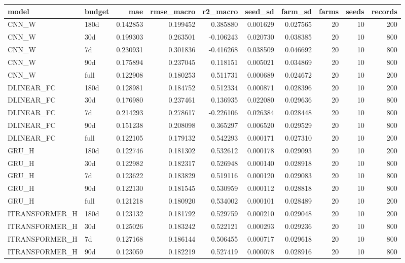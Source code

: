 \begin{tabular}{llrrrrrrrr}
\toprule
model & budget & mae & rmse\_macro & r2\_macro & seed\_sd & farm\_sd & farms & seeds & records \\
\midrule
CNN\_W & 180d & 0.142853 & 0.199452 & 0.385880 & 0.001629 & 0.027565 & 20 & 10 & 200 \\
CNN\_W & 30d & 0.199303 & 0.263501 & -0.106243 & 0.020730 & 0.038385 & 20 & 10 & 800 \\
CNN\_W & 7d & 0.230931 & 0.301836 & -0.416268 & 0.038509 & 0.046692 & 20 & 10 & 800 \\
CNN\_W & 90d & 0.175894 & 0.237045 & 0.118151 & 0.005021 & 0.034869 & 20 & 10 & 800 \\
CNN\_W & full & 0.122908 & 0.180253 & 0.511731 & 0.000689 & 0.024672 & 20 & 10 & 200 \\
DLINEAR\_FC & 180d & 0.128981 & 0.184752 & 0.512334 & 0.000871 & 0.028396 & 20 & 10 & 200 \\
DLINEAR\_FC & 30d & 0.176980 & 0.237461 & 0.136935 & 0.022080 & 0.029636 & 20 & 10 & 800 \\
DLINEAR\_FC & 7d & 0.214293 & 0.278617 & -0.226106 & 0.026384 & 0.028448 & 20 & 10 & 800 \\
DLINEAR\_FC & 90d & 0.151238 & 0.208098 & 0.365297 & 0.006520 & 0.029529 & 20 & 10 & 800 \\
DLINEAR\_FC & full & 0.122105 & 0.179132 & 0.542293 & 0.000171 & 0.027310 & 20 & 10 & 200 \\
GRU\_H & 180d & 0.122746 & 0.181302 & 0.532612 & 0.000178 & 0.029093 & 20 & 10 & 200 \\
GRU\_H & 30d & 0.122982 & 0.182317 & 0.526948 & 0.000140 & 0.028918 & 20 & 10 & 800 \\
GRU\_H & 7d & 0.123622 & 0.183829 & 0.519116 & 0.000120 & 0.029083 & 20 & 10 & 800 \\
GRU\_H & 90d & 0.122130 & 0.181545 & 0.530959 & 0.000112 & 0.028818 & 20 & 10 & 800 \\
GRU\_H & full & 0.121218 & 0.180920 & 0.534002 & 0.000101 & 0.028489 & 20 & 10 & 200 \\
ITRANSFORMER\_H & 180d & 0.123132 & 0.181792 & 0.529759 & 0.000210 & 0.029048 & 20 & 10 & 200 \\
ITRANSFORMER\_H & 30d & 0.125026 & 0.183242 & 0.522121 & 0.000293 & 0.029236 & 20 & 10 & 800 \\
ITRANSFORMER\_H & 7d & 0.127168 & 0.186144 & 0.506455 & 0.000717 & 0.029618 & 20 & 10 & 800 \\
ITRANSFORMER\_H & 90d & 0.123059 & 0.182219 & 0.527419 & 0.000078 & 0.028916 & 20 & 10 & 800 \\

\end{tabular}
